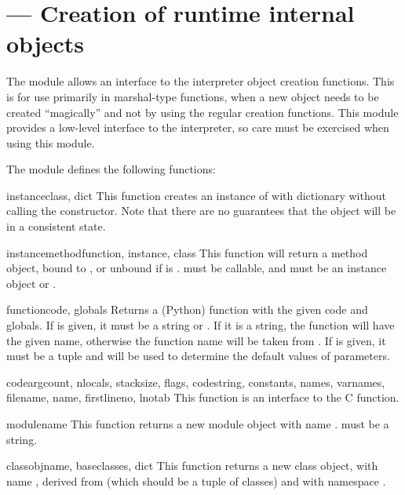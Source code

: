 \section{ ---
         Creation of runtime internal objects}



The  module allows an interface to the interpreter object
creation functions. This is for use primarily in marshal-type functions,
when a new object needs to be created ``magically'' and not by using the
regular creation functions. This module provides a low-level interface
to the interpreter, so care must be exercised when using this module.

The  module defines the following functions:

\begin{funcdesc}{instance}{class, dict}
This function creates an instance of  with dictionary
 without calling the  constructor. Note that
there are no guarantees that the object will be in a consistent state.
\end{funcdesc}

\begin{funcdesc}{instancemethod}{function, instance, class}
This function will return a method object, bound to , or
unbound if  is .   must be
callable, and  must be an instance object or
.
\end{funcdesc}

\begin{funcdesc}{function}{code, globals}
Returns a (Python) function with the given code and globals. If
 is given, it must be a string or .  If it is a
string, the function will have the given name, otherwise the function
name will be taken from .  If
 is given, it must be a tuple and will be used to
determine the default values of parameters.
\end{funcdesc}

\begin{funcdesc}{code}{argcount, nlocals, stacksize, flags, codestring,
                       constants, names, varnames, filename, name, firstlineno,
                       lnotab}
This function is an interface to the  C
function.
\end{funcdesc}

\begin{funcdesc}{module}{name}
This function returns a new module object with name .
 must be a string.
\end{funcdesc}

\begin{funcdesc}{classobj}{name, baseclasses, dict}
This function returns a new class object, with name , derived
from  (which should be a tuple of classes) and with
namespace .
\end{funcdesc}
